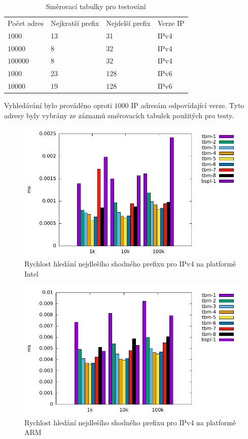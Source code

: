 \begin{table}[!htbp]
	\center
    \begin{tabular}{|l|l|l|l|}
    \hline
    Počet adres & Nejkratší prefix & Nejdelší prefix & Verze IP \\ \hhline{|=|=|=|=|}
    $1000$ & 13 & 31 & IPv4 \\ \hline
    $10000$ & 8 & 32 & IPv4 \\ \hline
    $100000$ & 8 & 32 & IPv4 \\ \hline
    $1000$ & 23 & 128 & IPv6 \\ \hline
    $10000$ & 19 & 128 & IPv6 \\ \hline
    \end{tabular}
	\caption{Směrovací tabulky pro testování}
    \label{tab:lpm-input}
\end{table}

Vyhledávání bylo prováděno oproti $1000$ IP adresám odpovídající verze. Tyto adresy byly vybrány
ze záznamů směrovacích tabulek použitých pro testy.



\begin{figure}[H]
	\centering
	\includegraphics[scale=1]{fig/lpm-ipv4.pdf}
	\caption{Rychlost hledání nejdlešího shodného prefixu pro IPv4 na platformě Intel}
    \label{fig:lpm-ipv4}
\end{figure}

\begin{figure}[H]
    \centering
    \includegraphics[scale=1]{fig/lpm-ipv4-arm.pdf}
    \caption{Rychlost hledání nejdlešího shodného prefixu pro IPv4 na platformě ARM}
    \label{fig:lpm-ipv4-arm}
\end{figure}

